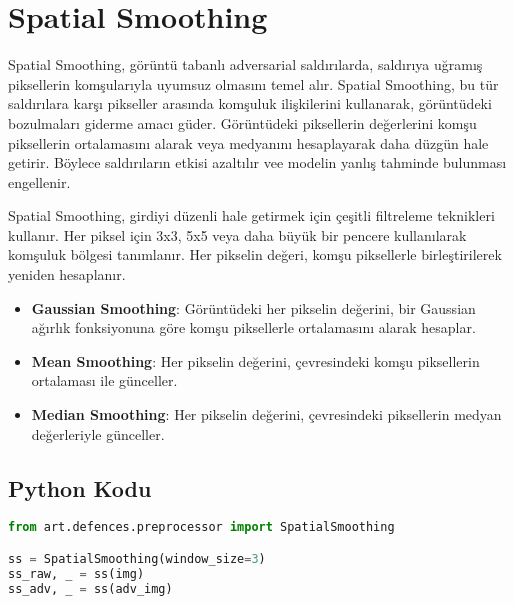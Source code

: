 \section{Spatial Smoothing}

Spatial Smoothing, görüntü tabanlı adversarial saldırılarda, saldırıya uğramış piksellerin komşularıyla uyumsuz olmasını temel alır. Spatial Smoothing, bu tür saldırılara karşı pikseller arasında komşuluk ilişkilerini kullanarak, görüntüdeki bozulmaları giderme amacı güder. Görüntüdeki piksellerin değerlerini komşu piksellerin ortalamasını alarak veya medyanını hesaplayarak daha düzgün hale getirir. Böylece saldırıların etkisi azaltılır vee modelin yanlış tahminde bulunması engellenir.

Spatial Smoothing, girdiyi düzenli hale getirmek için çeşitli filtreleme teknikleri kullanır. Her piksel için 3x3, 5x5 veya daha büyük bir pencere kullanılarak komşuluk bölgesi tanımlanır. Her pikselin değeri, komşu piksellerle birleştirilerek yeniden hesaplanır.

\begin{itemize}
    \item \textbf{Gaussian Smoothing}: Görüntüdeki her pikselin değerini, bir Gaussian ağırlık fonksiyonuna göre komşu piksellerle ortalamasını alarak hesaplar.
    \item \textbf{Mean Smoothing}: Her pikselin değerini, çevresindeki komşu piksellerin ortalaması ile günceller.
    \item \textbf{Median Smoothing}: Her pikselin değerini, çevresindeki piksellerin medyan değerleriyle günceller.
\end{itemize}

\subsection{Python Kodu}

\begin{lstlisting}[language=Python]
from art.defences.preprocessor import SpatialSmoothing

ss = SpatialSmoothing(window_size=3)
ss_raw, _ = ss(img)
ss_adv, _ = ss(adv_img)
\end{lstlisting}

\newpage